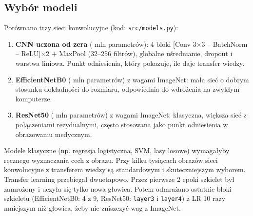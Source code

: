 \subsection*{Wybór modeli}
Porównano trzy sieci konwolucyjne (kod: \texttt{src/models.py}):
\begin{enumerate}
\item \textbf{CNN uczona od zera} (\cvParamsCnn{} mln parametrów): 4 bloki
  [Conv 3$\times$3 -- BatchNorm -- ReLU]$\times$2 + MaxPool (32--256 filtrów), globalne
  uśrednianie, dropout i warstwa liniowa. Punkt odniesienia, który pokazuje, ile daje
  transfer wiedzy.
\item \textbf{EfficientNetB0} (\cvParamsEff{} mln parametrów) z wagami ImageNet: mała sieć
  o dobrym stosunku dokładności do rozmiaru, odpowiednia do wdrożenia na zwykłym komputerze.
\item \textbf{ResNet50} (\cvParamsRes{} mln parametrów) z wagami ImageNet: klasyczna, większa
  sieć z połączeniami rezydualnymi, często stosowana jako punkt odniesienia w obrazowaniu medycznym.
\end{enumerate}
Modele klasyczne (np. regresja logistyczna, SVM, lasy losowe) wymagałyby ręcznego
wyznaczania cech z obrazu. Przy kilku tysiącach obrazów sieci konwolucyjne z transferem
wiedzy są standardowym i skuteczniejszym wyborem. Transfer learning przebiegał dwuetapowo.
Przez pierwsze 2 epoki szkielet był zamrożony i uczyła się tylko nowa głowica. Potem
odmrażano ostatnie bloki szkieletu (EfficientNetB0: 4 z 9, ResNet50: \texttt{layer3}
i \texttt{layer4}) z LR 10 razy mniejszym niż głowica, żeby nie zniszczyć wag z ImageNet.

